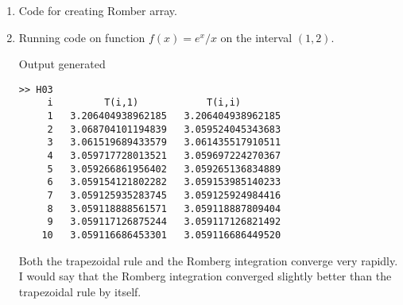 \documentclass[11pt]{article}
\begin{document}
\begin{enumerate}
\begin{enumerate}
                Now consider $T_{k+1,0}$
                \begin{align*}
                    T_{h_{k+1}} &= h_{k+1} \p{\frac{1}{2} f(a) + \sum{r=1}{2^{k+1} - 1}{f(a + r h_{k+1})}
                        + \frac{1}{2} f(b)}
                    \intertext{Note that $h_{k+1} = \frac{1}{2} h_k$}
                    &= \frac{1}{2} h_k \p{\frac{1}{2} f(a) + \sum{r=1}{2^{k+1} - 1}{f(a + \frac{1}{2} r h_k)} + \frac{1}{2} f(b)}
                    \intertext{Also note that $r$ is either even or odd.
                        If $r$ is even then $r = 2n$ for $1 \le n \le 2^k - 1$.
                        If $r$ is odd then $r = 2m - 1$, for $1 \le m \le 2^k$.}
                    &= \frac{1}{2} h_k \p{\frac{1}{2} f(a) + \sum{n=1}{2^{k} - 1}{f(a + n h_k)} + \sum{m=1}{2^{k}}{f(a + (m - \frac{1}{2})h_k)} + \frac{1}{2} f(b)} \\
                    &= \frac{1}{2} \p{h_k\p{\frac{1}{2} f(a) + \sum{n=1}{2^{k} - 1}{f(a + n h_k)} + \frac{1}{2} f(b)} + h_k\sum{m=1}{2^{k}}{f(a + (m - \frac{1}{2})h_k)}} \\
                    &= \frac{1}{2} \p{T_{k,0} + M_{h_k}}
                \end{align*}
                This verifies the recursive relation.

            \item[(b)]
                Code for creating Romber array.
                
                
            \item[(c)]
                Running code on function $f(x) = e^x/x$ on the interval $(1,2)$.
                

                Output generated
                \begin{verbatim}
>> H03
     i         T(i,1)            T(i,i) 
     1   3.206404938962185   3.206404938962185 
     2   3.068704101194839   3.059524045343683 
     3   3.061519689433579   3.061435517910511 
     4   3.059717728013521   3.059697224270367 
     5   3.059266861956402   3.059265136834889 
     6   3.059154121802282   3.059153985140233 
     7   3.059125935283745   3.059125924984416 
     8   3.059118888561571   3.059118887809404 
     9   3.059117126875244   3.059117126821492 
    10   3.059116686453301   3.059116686449520 
                \end{verbatim}

                Both the trapezoidal rule and the Romberg integration converge
                very rapidly.
                I would say that the Romberg integration converged slightly better
                than the trapezoidal rule by itself.
        \end{enumerate}
\end{enumerate}
\end{document}

